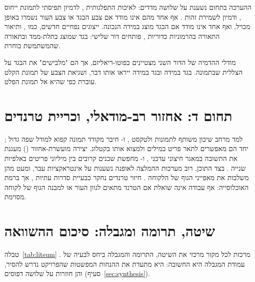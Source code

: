 ההערכה בתחום נשענת על שלושה מדדים:  לאיכות התפלגותית \cite{heusel2017fid},  לדמיון תפיסתי לתמונת ייחוס \cite{zhang2018lpips}, ודמיון  לשמירת זהות \cite{deng2019arcface}. אף אחד מהם אינו מודד אם צבע הבגד או צבע העור נשמרו באופן מכויל, ואף אחד אינו מודד אם הבגד מוצג במידה הנכונה. ייצוגים נפחיים חדשים, כמו  \cite{kerbl2023gaussian}, ותיאור התאורה בהרמוניות כדוריות \cite{ramamoorthi2001sh}, פותחים דור שלישי: בגד שמוצג בתלת-ממד ובתאורה שהמשתמשת בוחרת.

\begin{keymessagebox}
מודלי ההדמיה של הדור השני מצטיינים בפוטו-ריאליזם, אך הם "מלבישים" את הבגד על הצללית שבתמונה. בגד במידה  ובגד במידה  ייראו אותו דבר, ושגיאת הצבע של תמונת הקלט עוברת כפי שהיא אל תמונת הפלט.
\end{keymessagebox}

\section{תחום ד: אחזור רב-מודאלי,  וכריית טרנדים}
\label{sec:lit-rag}

 למד מרחב שיכון משותף לתמונות ולטקסט \cite{radford2021clip}, ו- חיבר מקודד תמונה קפוא למודל שפה גדול \cite{li2023blip2}; יחד הם מאפשרים לתאר פריט במילים ולמצוא אותו בקטלוג. יצירה מועשרת-אחזור () מעגנת את התשובה במאגר חיצוני עדכני \cite{lewis2020rag}, ו- מחפשת שכנים קרובים בין מיליוני פריטים באלפיות שנייה \cite{johnson2021faiss}. בצד התוכן, רוב מערכות ההמלצה לאופנה נשענות על אינטראקציות עבר, ומעט מהן משלבות את מאפייני הגוף של הלקוחה \cite{deldjoo2023fashionrec}. חיזוי טרנדים נחקר כבעיית סדרות עתיות \cite{alhalah2017fashionforward,ma2020fashiontrend}, אך ברמת האוכלוסייה: אף עבודה אינה שואלת אם הטרנד מתאים לגוון העור או למבנה הגוף של לקוחה מסוימת.

\section{שיטה, תרומה ומגבלה: סיכום ההשוואה}
\label{sec:lit-summary}

טבלה~\ref{tab:litsum} מרכזת לכל מקור מרכזי את השיטה, התרומה והמגבלה ביחס לבעיה של . עמודת המגבלה היא החשובה: היא מתעדת את ההנחות המפשטות שהפרויקט נדרש להסיר, והן חוזרות על שלושה דפוסים (סעיף~\ref{sec:synthesis}).

